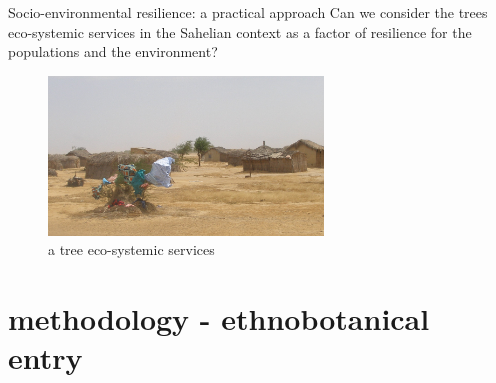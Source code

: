 \documentclass[newPxFont]{beamer}
\begin{document}
\begin{frame}[c]{Socio-environmental resilience: a practical approach}
\vspace{-1cm}
Can we consider the trees eco-systemic services in the Sahelian context as a factor of resilience for the populations and the environment?


\begin{figure}
	\centering
	\includegraphics[width = 0.65\textwidth]{img/PA310152.JPG}
	\caption{a tree eco-systemic services}
\end{figure}
\end{frame}


\section{methodology - ethnobotanical entry}
\end{document}
